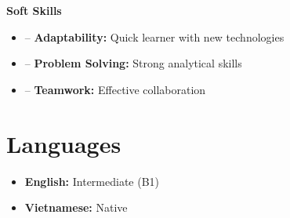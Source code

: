 \documentclass[a4paper,12pt]{article}
\newenvironment{itemList}[3][]
    {
    \noindent\hspace{1em}\textbf{#2}\hfill#3\\[3.75pt]
    \begin{minipage}[t]{\linewidth}
    \begin{itemize}[nosep,after=\strut, leftmargin=2em, itemsep=3pt,label={},#1]
    }
    {
    \end{itemize}
    \end{minipage}
    }
\begin{document}
\begin{itemList}[itemsep=5pt]{Soft Skills}{}
    \item -- \textbf{Adaptability:} Quick learner with new technologies
    \item -- \textbf{Problem Solving:} Strong analytical skills
    \item -- \textbf{Teamwork:} Effective collaboration
\end{itemList}

\section{Languages}
\begin{itemize}[nosep,after=\strut, leftmargin=1em, itemsep=4pt, label={}]
    \item \textbf{English:} Intermediate (B1)
    \item \textbf{Vietnamese:} Native
\end{itemize}

\vfill
{}
\end{document}

